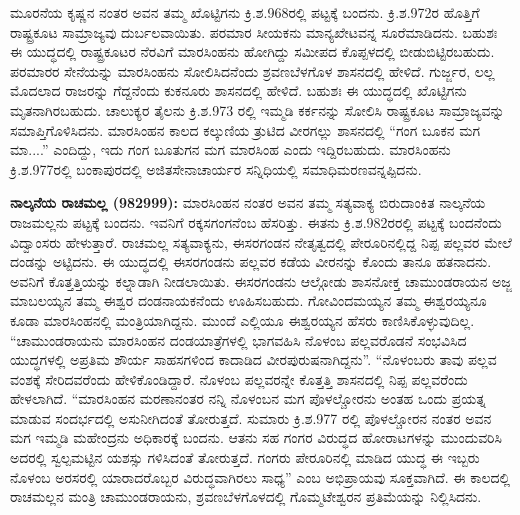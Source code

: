 ಮೂರನೆಯ ಕೃಷ್ಣನ ನಂತರ ಅವನ ತಮ್ಮ ಖೊಟ್ಟಿಗನು ಕ್ರಿ.ಶ.968ರಲ್ಲಿ ಪಟ್ಟಕ್ಕೆ ಬಂದನು. ಕ್ರಿ.ಶ.972ರ ಹೊತ್ತಿಗೆ ರಾಷ್ಟ್ರಕೂಟ ಸಾಮ್ರಾಜ್ಯವು ದುರ್ಬಲವಾಯಿತು. ಪರಮಾರ ಸೀಯಕನು ಮಾನ್ಯಖೇಟವನ್ನ ಸೂರೆಮಾಡಿದನು. ಬಹುಶಃ ಈ ಯುದ್ಧದಲ್ಲಿ ರಾಷ್ಟ್ರಕೂಟರ ನೆರವಿಗೆ ಮಾರಸಿಂಹನು ಹೋಗಿದ್ದು ಸಮೀಪದ ಕೊಪ್ಪಳದಲ್ಲಿ ಬೀಡುಬಿಟ್ಟಿರಬಹುದು. ಪರಮಾರರ ಸೇನೆಯನ್ನು ಮಾರಸಿಂಹನು ಸೋಲಿಸಿದನೆಂದು ಶ್ರವಣಬೆಳಗೊಳ ಶಾಸನದಲ್ಲಿ ಹೇಳಿದೆ. ಗುರ್ಜ್ಜರ, ಲಲ್ಲ ಮೊದಲಾದ ರಾಜರನ್ನು ಗೆದ್ದನೆಂದು ಕುಕನೂರು ಶಾಸನದಲ್ಲಿ ಹೇಳಿದೆ. ಬಹುಶಃ ಈ ಯುದ್ಧದಲ್ಲಿ ಖೊಟ್ಟಿಗನು ಮೃತನಾಗಿರಬಹುದು. ಚಾಲುಕ್ಯರ ತೈಲನು ಕ್ರಿ.ಶ.973 ರಲ್ಲಿ ಇಮ್ಮಡಿ ಕರ್ಕನನ್ನು ಸೋಲಿಸಿ ರಾಷ್ಟ್ರಕೂಟ ಸಾಮ್ರಾಜ್ಯವನ್ನು ಸಮಾಪ್ತಿಗೊಳಿಸಿದನು. ಮಾರಸಿಂಹನ ಕಾಲದ ಕಲ್ಕುಣಿಯ ತ್ರುಟಿದ ವೀರಗಲ್ಲು ಶಾಸನದಲ್ಲಿ “ಗಂಗ ಬೂಕನ ಮಗ ಮಾ....” ಎಂದಿದ್ದು, ಇದು ಗಂಗ ಬೂತುಗನ ಮಗ ಮಾರಸಿಂಹ ಎಂದು ಇದ್ದಿರಬಹುದು. ಮಾರಸಿಂಹನು ಕ್ರಿ.ಶ.977ರಲ್ಲಿ ಬಂಕಾಪುರದಲ್ಲಿ ಅಜಿತಸೇನಾಚಾರ್ಯರ ಸನ್ನಿಧಿಯಲ್ಲಿ ಸಮಾಧಿಮರಣವನ್ನಪ್ಪಿದನು.

\textbf{ ನಾಲ್ಕನೆಯ ರಾಚಮಲ್ಲ (982999):} ಮಾರಸಿಂಹನ ನಂತರ ಅವನ ತಮ್ಮ ಸತ್ಯವಾಕ್ಯ ಬಿರುದಾಂಕಿತ ನಾಲ್ಕನೆಯ ರಾಜಮಲ್ಲನು ಪಟ್ಟಕ್ಕೆ ಬಂದನು. ಇವನಿಗೆ ರಕ್ಕಸಗಂಗನೆಂಬ ಹೆಸರಿತ್ತು. ಈತನು ಕ್ರಿ.ಶ.982ರರಲ್ಲಿ ಪಟ್ಟಕ್ಕೆ ಬಂದನೆಂದು ವಿದ್ವಾಂಸರು ಹೇಳುತ್ತಾರೆ. ರಾಚಮಲ್ಲ ಸತ್ಯವಾಕ್ಯನು, ಈಸರಗಂಡನ ನೇತೃತ್ವದಲ್ಲಿ ಪೇರೂರಿನಲ್ಲಿದ್ದ ನಿಪ್ಪ ಪಲ್ಲವರ ಮೇಲೆ ದಂಡನ್ನು ಅಟ್ಟಿದನು. ಈ ಯುದ್ಧದಲ್ಲಿ ಈಸರಗಂಡನು ಪಲ್ಲವರ ಕಡೆಯ ವೀರನನ್ನು ಕೊಂದು ತಾನೂ ಹತನಾದನು. ಅವನಿಗೆ ಕೊತ್ತತ್ತಿಯನ್ನು ಕಲ್ನಾಡಾಗಿ ನೀಡಲಾಯಿತು. ಈಸರಗಂಡನು ಆಲ್ಗೋಡು ಶಾಸನೋಕ್ತ ಚಾಮುಂಡರಾಯನ ಅಜ್ಜ ಮಾಬಲಯ್ಯನ ತಮ್ಮ ಈಶ್ವರ ದಂಡನಾಯಕನೆಂದು ಊಹಿಸಬಹುದು. ಗೋವಿಂದಮಯ್ಯನ ತಮ್ಮ ಈಶ್ವರಯ್ಯನೂ ಕೂಡಾ ಮಾರಸಿಂಹನಲ್ಲಿ ಮಂತ್ರಿಯಾಗಿದ್ದನು. ಮುಂದೆ ಎಲ್ಲಿಯೂ ಈಶ್ವರಯ್ಯನ ಹೆಸರು ಕಾಣಿಸಿಕೊಳ್ಳುವುದಿಲ್ಲ. “ಚಾಮುಂಡರಾಯನು ಮಾರಸಿಂಹನ ದಂಡಯಾತ್ರೆಗಳಲ್ಲಿ ಭಾಗವಹಿಸಿ ನೊಳಂಬ ಪಲ್ಲವರೊಡನೆ ಸಂಭವಿಸಿದ ಯುದ್ಧಗಳಲ್ಲಿ ಅಪ್ರತಿಮ ಶೌರ್ಯ ಸಾಹಸಗಳಿಂದ ಕಾದಾಡಿದ ವೀರಪುರುಷನಾಗಿದ್ದನು”. “ನೊಳಂಬರು ತಾವು ಪಲ್ಲವ ವಂಶಕ್ಕೆ ಸೇರಿದವರೆಂದು ಹೇಳಿಕೊಂಡಿದ್ದಾರೆ. ನೊಳಂಬ ಪಲ್ಲವರನ್ನೇ ಕೊತ್ತತ್ತಿ ಶಾಸನದಲ್ಲಿ ನಿಪ್ಪ ಪಲ್ಲವರೆಂದು ಹೇಳಲಾಗಿದೆ. “ಮಾರಸಿಂಹನ ಮರಣಾನಂತರ ನನ್ನಿ ನೊಳಂಬನ ಮಗ ಪೊಳಲ್ಚೋರನು ಅಂತಹ ಒಂದು ಪ್ರಯತ್ನ ಮಾಡುವ ಸಂದರ್ಭದಲ್ಲಿ ಅಸುನೀಗಿದಂತೆ ತೋರುತ್ತದೆ. ಸುಮಾರು ಕ್ರಿ.ಶ.977 ರಲ್ಲಿ ಪೊಳಲ್ಚೋರನ ನಂತರ ಅವನ ಮಗ ಇಮ್ಮಡಿ ಮಹೇಂದ್ರನು ಅಧಿಕಾರಕ್ಕೆ ಬಂದನು. ಆತನು ಸಹ ಗಂಗರ ವಿರುದ್ಧದ ಹೋರಾಟಗಳನ್ನು ಮುಂದುವರಿಸಿ ಅದರಲ್ಲಿ ಸ್ವಲ್ಪಮಟ್ಟಿನ ಯಶಸ್ಸು ಗಳಿಸಿದಂತೆ ತೋರುತ್ತದೆ. ಗಂಗರು ಪೇರೂರಿನಲ್ಲಿ ಮಾಡಿದ ಯುದ್ಧ ಈ ಇಬ್ಬರು ನೊಳಂಬ ಅರಸರಲ್ಲಿ ಯಾರಾದರೊಬ್ಬರ ವಿರುದ್ಧವಾಗಿರಲು ಸಾಧ್ಯ” ಎಂಬ ಅಭಿಪ್ರಾಯವು ಸೂಕ್ತವಾಗಿದೆ. ಈ ಕಾಲದಲ್ಲಿ ರಾಚಮಲ್ಲನ ಮಂತ್ರಿ ಚಾಮುಂಡರಾಯನು, ಶ್ರವಣಬೆಳಗೊಳದಲ್ಲಿ ಗೊಮ್ಮಟೇಶ್ವರನ ಪ್ರತಿಮೆಯನ್ನು ನಿಲ್ಲಿಸಿದನು.


